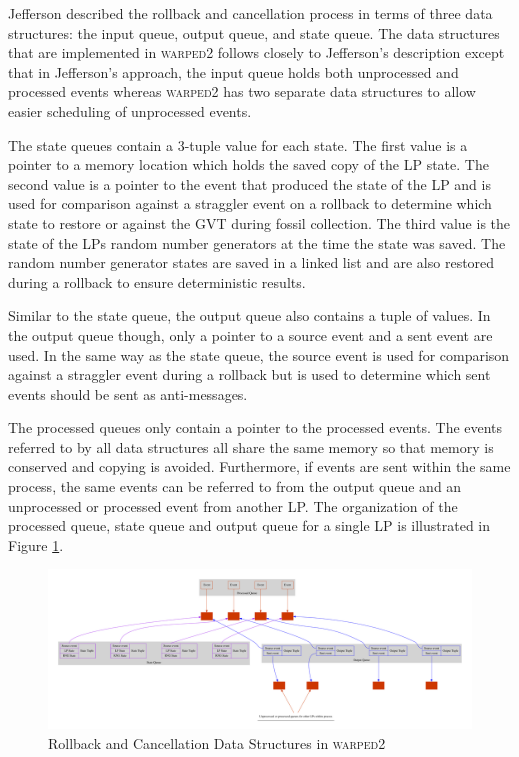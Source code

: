 \documentclass[11pt]{book}
\begin{document}
Jefferson \cite{jefferson-85} described the rollback and cancellation process in terms of three data
structures: the input queue, output queue, and state queue.  The data structures that are
implemented in \textsc{warped2} follows closely to Jefferson's description except that in
Jefferson's approach, the input queue holds both unprocessed and processed events whereas
\textsc{warped2} has two separate data structures to allow easier scheduling of unprocessed events.

The state queues contain a 3-tuple value for each state.  The first value is a pointer to a memory
location which holds the saved copy of the LP state.  The second value is a pointer to the event
that produced the state of the LP and is used for comparison against a straggler event on a rollback
to determine which state to restore or against the GVT during fossil collection.  The third value is
the state of the LPs random number generators at the time the state was saved.  The random number
generator states are saved in a linked list and are also restored during a rollback to ensure
deterministic results.

Similar to the state queue, the output queue also contains a tuple of values.  In the output queue
though, only a pointer to a source event and a sent event are used.  In the same way as the state
queue, the source event is used for comparison against a straggler event during a rollback but is
used to determine which sent events should be sent as anti-messages.

The processed queues only contain a pointer to the processed events.  The events referred to by all
data structures all share the same memory so that memory is conserved and copying is avoided.
Furthermore, if events are sent within the same process, the same events can be referred to from the
output queue and an unprocessed or processed event from another LP.  The organization of the
processed queue, state queue and output queue for a single LP is illustrated in Figure
\ref{rollback_ds}.

\begin{figure}
    \centering
    \includegraphics[width=\textwidth,quiet]{figs/graphviz/rollback_ds.pdf}
    \caption{Rollback and Cancellation Data Structures in \textsc{warped2}}\label{rollback_ds}
\end{figure}
\end{document}
